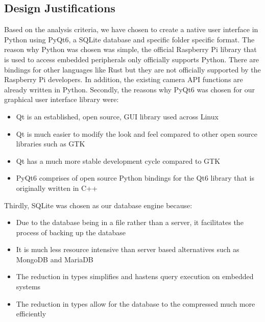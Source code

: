\subsection{Design Justifications}
Based on the analysis criteria, we have chosen to create a native user interface in Python using PyQt6, a SQLite database and specific folder specific format.\cite{PyQt2023}\cite{SQLite2023} The reason why Python was chosen was simple, the official Raspberry Pi library that is used to access embedded peripherals only officially supports Python. There are bindings for other languages like Rust but they are not officially supported by the Raspberry Pi developers. In addition, the existing camera API functions are already written in Python. Secondly, the reasons why PyQt6 was chosen for our graphical user interface library were:
\begin{itemize}
	\item Qt is an established, open source, GUI library used across Linux
	\item Qt is much easier to modify the look and feel compared to other open source libraries such as GTK
	\item Qt has a much more stable development cycle compared to GTK
	\item PyQt6 comprises of open source Python bindings for the Qt6 library that is originally written in C++
\end{itemize}
Thirdly, SQLite was chosen as our database engine because:
\begin{itemize}
	\item Due to the database being in a file rather than a server, it facilitates the process of backing up the database
	\item It is much less resource intensive than server based alternatives such as MongoDB and MariaDB
	\item The reduction in types simplifies and hastens query execution on embedded systems
	\item The reduction in types allow for the database to the compressed much more efficiently
\end{itemize}

